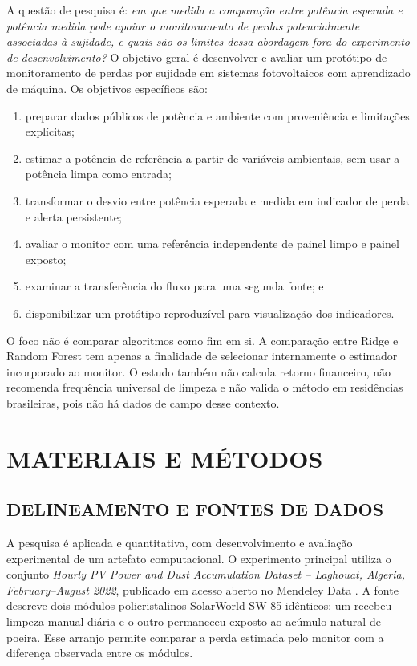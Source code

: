 \documentclass{UNESC}
\begin{document}
A questão de pesquisa é: \textit{em que medida a comparação entre potência esperada e potência medida pode apoiar o monitoramento de perdas potencialmente associadas à sujidade, e quais são os limites dessa abordagem fora do experimento de desenvolvimento?} O objetivo geral é desenvolver e avaliar um protótipo de monitoramento de perdas por sujidade em sistemas fotovoltaicos com aprendizado de máquina. Os objetivos específicos são:

\begin{enumerate}[label=\alph*),leftmargin=1.2cm,itemsep=0.1em]
\item preparar dados públicos de potência e ambiente com proveniência e limitações explícitas;
\item estimar a potência de referência a partir de variáveis ambientais, sem usar a potência limpa como entrada;
\item transformar o desvio entre potência esperada e medida em indicador de perda e alerta persistente;
\item avaliar o monitor com uma referência independente de painel limpo e painel exposto;
\item examinar a transferência do fluxo para uma segunda fonte; e
\item disponibilizar um protótipo reproduzível para visualização dos indicadores.
\end{enumerate}

O foco não é comparar algoritmos como fim em si. A comparação entre Ridge e Random Forest tem apenas a finalidade de selecionar internamente o estimador incorporado ao monitor. O estudo também não calcula retorno financeiro, não recomenda frequência universal de limpeza e não valida o método em residências brasileiras, pois não há dados de campo desse contexto.

\section{MATERIAIS E MÉTODOS}

\subsection{DELINEAMENTO E FONTES DE DADOS}

A pesquisa é aplicada e quantitativa, com desenvolvimento e avaliação experimental de um artefato computacional. O experimento principal utiliza o conjunto \textit{Hourly PV Power and Dust Accumulation Dataset -- Laghouat, Algeria, February--August 2022}, publicado em acesso aberto no Mendeley Data \cite{seghir2026}. A fonte descreve dois módulos policristalinos SolarWorld SW-85 idênticos: um recebeu limpeza manual diária e o outro permaneceu exposto ao acúmulo natural de poeira. Esse arranjo permite comparar a perda estimada pelo monitor com a diferença observada entre os módulos.
\end{document}
